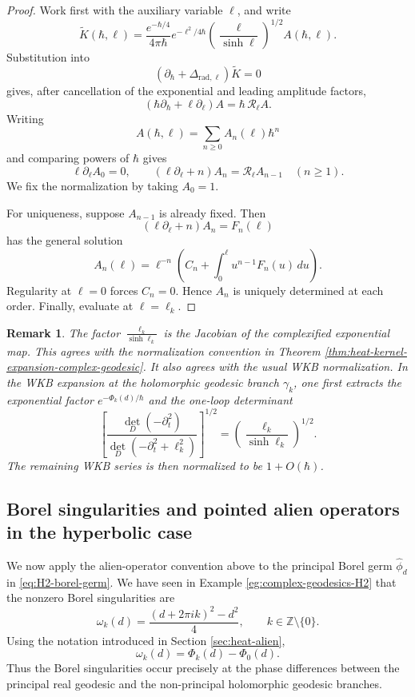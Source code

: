 \documentclass[11pt]{amsart}
\theoremstyle{plain}
\newtheorem{rmk}[thm]{Remark}
\theoremstyle{definition}
\newcommand{\Z}{\mathbb Z}
\newcommand{\rad}{\text{rad}}
\begin{document}
\begin{proof}
Work first with the auxiliary variable $\ell$, and write
\[
\widetilde{K}(\hbar,\ell)
=\frac{e^{-\hbar/4}}{4\pi\hbar}
e^{-\ell^2/4\hbar}\left(\frac{\ell}{\sinh\ell}\right)^{1/2}A(\hbar,\ell).
\]
Substitution into
\[
(\partial_\hbar+\Delta_{\rad,\ell})\widetilde{K}=0
\]
gives, after cancellation of the exponential and leading amplitude factors,
\[
\left(\hbar\partial_\hbar+\ell\partial_\ell\right)A=\hbar\,\mathcal R_\ell A.
\]
Writing
\[
A(\hbar,\ell)=\sum_{n\ge0}A_n(\ell)\hbar^n
\]
and comparing powers of $\hbar$ gives
\[
\ell\partial_\ell A_0=0,\qquad
(\ell\partial_\ell+n)A_n=\mathcal R_\ell A_{n-1}\quad(n\ge1).
\]
We fix the normalization by taking $A_0=1$.

For uniqueness, suppose $A_{n-1}$ is already fixed.  Then
\[
(\ell\partial_\ell+n)A_n=F_n(\ell)
\]
has the general solution
\[
A_n(\ell)=\ell^{-n}
\left(C_n+\int_0^\ell u^{n-1}F_n(u)\,du\right).
\]
Regularity at $\ell=0$ forces $C_n=0$.  Hence $A_n$ is uniquely
determined at each order.  Finally, evaluate at $\ell=\ell_k$.
\end{proof}

\begin{rmk}\label{rmk:Normalizationconvetion}
The factor $\frac{\ell_k}{\sinh\ell_k}$ is the Jacobian of the complexified exponential map. This agrees with the normalization convention in Theorem \ref{thm:heat-kernel-expansion-complex-geodesic}. It also agrees with the usual WKB normalization.  In
the WKB expansion at the holomorphic geodesic branch $\gamma_k$, one first
extracts the exponential factor $e^{-\Phi_k(d)/\hbar}$ and the one-loop
determinant
\[
\left[\frac{\det_D(-\partial_t^2)}
{\det_D(-\partial_t^2+\ell_k^2)}\right]^{1/2}
=\left(\frac{\ell_k}{\sinh\ell_k}\right)^{1/2}.
\]
The remaining WKB series is then normalized to be $1+O(\hbar)$.  %
\end{rmk}


\subsection{Borel singularities and pointed alien operators in the hyperbolic case}

We now apply the alien-operator convention above to the principal Borel germ
$\widehat\phi_d$ in \eqref{eq:H2-borel-germ}.  
We have seen in Example \ref{eg:complex-geodesics-H2} that the nonzero Borel singularities are
\[\omega_k(d)=\frac{(d+2\pi i k)^2-d^2}{4},\qquad k\in\Z\setminus\{0\}.\]
Using the notation introduced in Section \ref{sec:heat-alien},
\[\omega_k(d)=\Phi_k(d)-\Phi_0(d).\]
Thus the Borel singularities occur precisely at the phase differences between
the principal real geodesic and the non-principal holomorphic geodesic branches.
\end{document}
